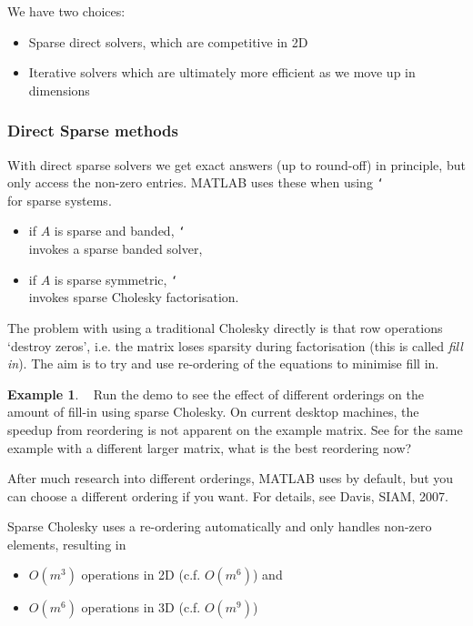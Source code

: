 \documentclass[12pt, a4paper]{article}
\theoremstyle{definition}
\newtheorem{example}[thm]{Example}
\theoremstyle{remark}
\numberwithin{equation}{section}
\newcommand\bslash{\char`\\}
\begin{document}
We have two choices:
\begin{itemize}
\item Sparse direct solvers, which are competitive in 2D
\item Iterative solvers which are ultimately more efficient as we move up in dimensions
\end{itemize}

\newpage

\subsubsection{Direct Sparse methods}
With direct sparse solvers we get exact answers (up to round-off) in principle, but only access the non-zero entries.
MATLAB uses these when using \texttt{\bslash} for sparse systems. 

\begin{itemize}
\item if $A$ is sparse and banded, \texttt{\bslash}  invokes a sparse banded solver, 
\item if $A$ is sparse symmetric, \texttt{\bslash}  invokes sparse Cholesky factorisation.
\end{itemize}

The problem with using a traditional Cholesky directly is that row operations `destroy zeros', i.e. the matrix loses sparsity during factorisation (this is called \emph{fill in}).
The aim is to try and use re-ordering of the equations to minimise fill in. 
\begin{example}{\ }
Run the demo  to see the effect of different orderings on the amount of fill-in using sparse Cholesky. On current desktop machines, the speedup from 
reordering is not apparent on the example matrix. See  for the same example with a different larger matrix, what is the best reordering now? 
\end{example}

After much research into different orderings, MATLAB uses  by default, but you can choose a different ordering if you want. For details, see Davis, SIAM, 2007. 

Sparse Cholesky uses a re-ordering automatically  and only handles non-zero elements, resulting in
\begin{itemize}
\item  $O(m^3)$ operations in 2D (c.f. $O(m^6)$) and
\item $O(m^6)$ operations in 3D (c.f. $O(m^9)$)
\end{itemize}
\end{document}
